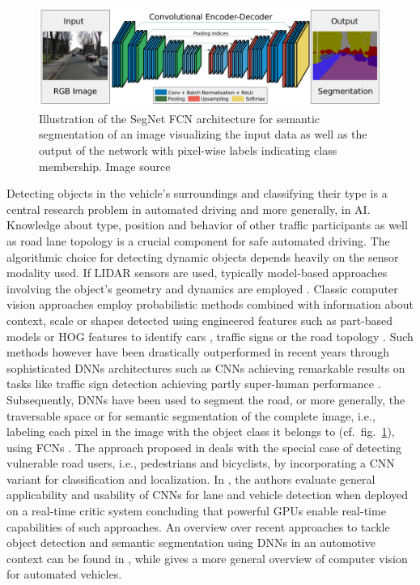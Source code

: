 \begin{figure}[t!]
    \centering
    \includegraphics[width=0.95\linewidth]{imgs/segnet.png}
    \caption{Illustration of the SegNet \ac{FCN} architecture for semantic segmentation of an image visualizing the input data as well as the output of the network with pixel-wise labels indicating class membership. Image source \cite{Badrinarayanan2015}}
    \label{fig:segnet_achitecture}
\end{figure}
Detecting objects in the vehicle's surroundings and classifying their type is a central research problem in automated driving and more generally, in \ac{AI}.
Knowledge about type, position and behavior of other traffic participants as well as road lane topology is a crucial component for safe automated driving.
The algorithmic choice for detecting dynamic objects depends heavily on the sensor modality used.
If \ac{LIDAR} sensors are used, typically model-based approaches involving the object's geometry and dynamics are employed \cite{Petrovskaya2009a, Petrovskaya2009, Darms2008}.
Classic computer vision approaches employ probabilistic methods combined with information about context, scale or shapes detected using engineered features such as part-based models or \ac{HOG} features to identify cars \cite{Held2012}, traffic signs \cite{Li2015} or the road topology \cite{Alvarez2011, Beyeler2014}.
Such methods however have been drastically outperformed in recent years through sophisticated \acp{DNN} architectures such as \acp{CNN} achieving remarkable results on tasks like traffic sign detection \cite{Ciresan2012, Sermanet2011} achieving partly super-human performance \cite{Stallkamp2012}.
Subsequently, \acp{DNN} have been used to segment the road, or more generally, the traversable space \cite{Mohan2014, Bittel2015} or for semantic segmentation of the complete image, i.e., labeling each pixel in the image with the object class it belongs to (cf.\ fig.~\ref{fig:segnet_achitecture}), using \acp{FCN} \cite{Badrinarayanan2015, Long2015, Chen2018}.
The approach proposed in \cite{Li2017} deals with the special case of detecting vulnerable road users, i.e., pedestrians and bicyclists, by incorporating a \ac{CNN} variant for classification and localization.
In \cite{Huval2015}, the authors evaluate general applicability and usability of \acp{CNN} for lane and vehicle detection when deployed on a real-time critic system concluding that powerful \acp{GPU} enable real-time capabilities of such approaches.
An overview over recent approaches to tackle object detection and semantic segmentation using \acp{DNN} in an automotive context can be found in \cite{Feng2019}, while \cite{Janai2017} gives a more general overview of computer vision for automated vehicles.

